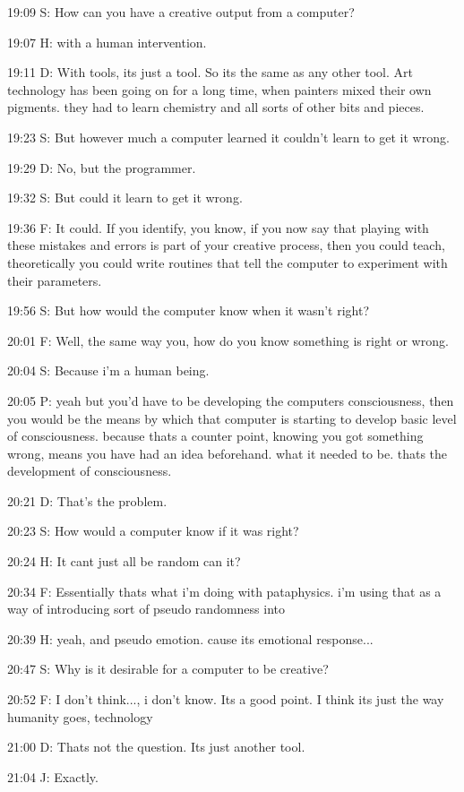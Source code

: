 19:09 S: How can you have a creative output from a computer?

19:07 H: with a human intervention.

19:11 D: With tools, its just a tool. So its the same as any other tool. Art technology has been going on for a long time, when painters mixed their own pigments. they had to learn chemistry and all sorts of other bits and pieces.

19:23 S: But however much a computer learned it couldn't learn to get it wrong.

19:29 D: No, but the programmer.

19:32 S: But could it learn to get it wrong.

19:36 F: It could. If you identify, you know, if you now say that playing with these mistakes and errors is part of your creative process, then you could teach, theoretically you could write routines that tell the computer to experiment with their parameters.

19:56 S: But how would the computer know when it wasn't right?

20:01 F: Well, the same way you, how do you know something is right or wrong.

20:04 S: Because i'm a human being.

20:05 P: yeah but you'd have to be developing the computers consciousness, then you would be the means by which that computer is starting to develop basic level of consciousness. because thats a counter point, knowing you got something wrong, means you have had an idea beforehand. what it needed to be. thats the development of consciousness.

20:21 D: That's the problem.

20:23 S: How would a computer know if it was right?

20:24 H: It cant just all be random can it?

20:34 F: Essentially thats what i'm doing with pataphysics. i'm using that as a way of introducing sort of pseudo randomness into

20:39 H: yeah, and pseudo emotion. cause its emotional response...

20:47 S: Why is it desirable for a computer to be creative?

20:52 F: I don't think..., i don't know. Its a good point. I think its just the way humanity goes, technology

21:00 D: Thats not the question. Its just another tool.

21:04 J: Exactly.

